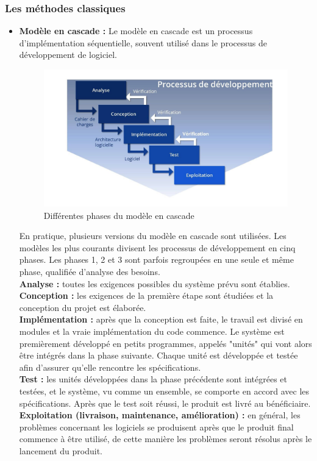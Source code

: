 \documentclass[a4paper, 12pt]{report}
\begin{document}
\subsubsection{Les méthodes classiques}
\begin{itemize}
  \item \textbf{Modèle en cascade :} Le modèle en cascade est un processus d'implémentation séquentielle, souvent utilisé dans le processus de développement de logiciel. 
\begin{figure}[!h]
\centering
\includegraphics[width = 1\linewidth]{img/wasserfallmodell.jpg}
\caption{Différentes phases du modèle en cascade}
\end{figure}
En pratique, plusieurs versions du modèle en cascade sont utilisées. Les modèles les plus courants divisent les processus de développement en cinq phases. Les phases 1, 2 et 3 sont parfois regroupées en une seule et même phase, qualifiée d’analyse des besoins. \\
\textbf{ Analyse :} toutes les exigences possibles du système prévu sont établies. \\
\textbf{ Conception :} les exigences de la première étape sont étudiées et la conception du projet est élaborée. \\
\textbf{ Implémentation :} après que la conception est faite, le travail est divisé en modules et la vraie implémentation du code commence. Le système est premièrement développé en petits programmes, appelés "unités" qui vont alors être intégrés dans la phase suivante. Chaque unité est développée et testée afin d'assurer qu'elle rencontre les spécifications. \\
\textbf{ Test :} les unités développées dans la phase précédente sont intégrées et testées, et le système, vu comme un ensemble, se comporte en accord avec les spécifications. Après que le test soit réussi, le produit est livré au bénéficiaire.\\
\textbf{ Exploitation (livraison, maintenance, amélioration) :} en général, les problèmes concernant les logiciels se produisent après que le produit final commence à être utilisé, de cette manière les problèmes seront résolus après le lancement du produit. \\


\end{itemize}
\end{document}
